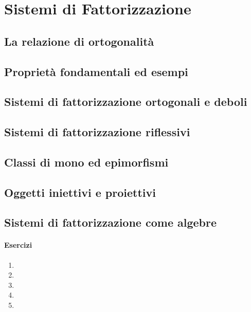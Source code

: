 \chapter{Sistemi di Fattorizzazione}
\section[]{La relazione di ortogonalità}
\section[]{Proprietà fondamentali ed esempi}
\section[]{Sistemi di fattorizzazione ortogonali e deboli}
\section[]{Sistemi di fattorizzazione riflessivi}
\section[]{Classi di mono ed epimorfismi}
\section[]{Oggetti iniettivi e proiettivi}
\section[]{Sistemi di fattorizzazione come algebre}
\subsubsection*{Esercizi}
\begin{enumerate}
    \item 
    \item 
    \item 
    \item 
    \item 
\end{enumerate}